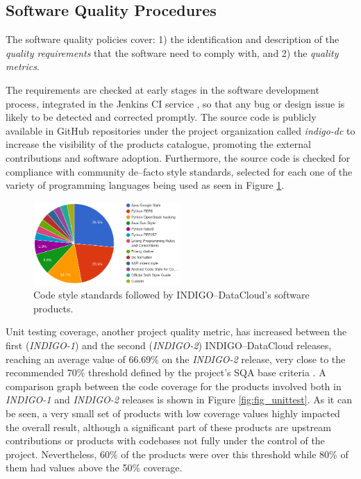 \documentclass[journal]{IEEEtran}
\begin{document}
\subsection{Software Quality Procedures}

The software quality policies \cite{indigo-d31} cover: 1) the identification
and description of the \emph{quality requirements} that the software need to
comply with, and 2) the \emph{quality metrics}.

The requirements are checked at early stages in the software development
process, integrated in the Jenkins CI service \cite{indigo-jenkins}, so that any
bug or design issue is likely to be detected and corrected promptly. The source
code is publicly available in GitHub repositories under the project organization called
{\sl indigo-dc} \cite{indigo-github} to increase the visibility of the products
catalogue, promoting the external contributions and software adoption. Furthermore,
the source code is checked for compliance with community de--facto style standards,
selected for each one of the variety of programming languages being used as seen in
Figure \ref{fig:fig_codestyle}.

\begin{figure}[ht]
\centering
\includegraphics[width=0.5\textwidth]{images/codestyle.png}
\caption{Code style standards followed by INDIGO--DataCloud's software products.}
\label{fig:fig_codestyle}
\end{figure}

Unit testing coverage, another project quality metric, has increased between the first ({\sl INDIGO-1}) and the
second ({\sl INDIGO-2}) INDIGO--DataCloud releases, reaching an average value of
66.69\% on the {\sl INDIGO-2} release, very close to the recommended 70\% threshold
defined by the project’s SQA base criteria \cite{indigo-d31}. A comparison graph
between the code coverage for the products involved both in {\sl INDIGO-1} and
{\sl INDIGO-2} releases is shown in Figure \ref{fig:fig_unittest}. As it can be seen,
a very small set of products with low coverage values highly impacted the overall
result, although a significant part of these products are upstream contributions
or products with codebases not fully under the control of the project. Nevertheless,
60\% of the products were over this threshold while 80\% of them had values above
the 50\% coverage.
\end{document}
